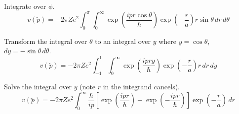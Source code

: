 Integrate over $\phi$.
\begin{equation*}
v(\breve p)=-2\pi Ze^2\int_0^\pi\int_0^\infty
\exp\left(\frac{i\breve pr\cos\theta}{\hbar}\right)
\exp\left(-\frac{r}{a}\right)r\sin\theta
\,dr\,d\theta
\end{equation*}

\iffalse
Convert the first exponential to rectangular form.
\begin{equation*}
v(\breve p)=-2\pi Ze^2\int_0^\pi\int_0^\infty
\left[\cos\left(\frac{\breve pr\cos\theta}{\hbar}\right)
+i\sin\left(\frac{\breve pr\cos\theta}{\hbar}\right)\right]
\exp\left(-\frac{r}{a}\right)r\sin\theta\,dr\,d\theta
\end{equation*}

By the definite integrals
\begin{equation*}
\int_0^\pi\cos(a\cos\theta)\sin\theta\,d\theta=\frac{2\sin a}{a},\quad
\int_0^\pi\sin(a\cos\theta)\sin\theta\,d\theta=0
\end{equation*}

we have for the integral over $\theta$ (note that $r$ in the integrand cancels)
\begin{equation*}
v(\breve p)=-\frac{4\pi Ze^2\hbar}{\breve p}
\int_0^\infty
\sin\left(\frac{\breve pr}{\hbar}\right)
\exp\left(-\frac{r}{a}\right)\,dr
\end{equation*}

By the definite integral
\begin{equation*}
\int_0^\infty\sin(ay)\exp(-by)\,dy=\frac{a}{a^2+b^2}
\end{equation*}

we have for the integral over $r$
\begin{equation*}
v(\breve p)=-\frac{4\pi Ze^2\hbar}{\breve p}\times
\frac{\breve p/\hbar}
{(\breve p/\hbar)^2+(1/a)^2}
\end{equation*}

Hence
\begin{equation*}
v(\breve p)=-\frac{4\pi Ze^2}
{(\breve p/\hbar)^2+(1/a)^2}
\end{equation*}
\fi

Transform the integral over $\theta$ to an integral over $y$
where $y=\cos\theta$, $dy=-\sin\theta\,d\theta$.
\begin{equation*}
v(\breve p)=-2\pi Ze^2
\int_{-1}^1
\int_0^\infty
\exp\left(\frac{ipry}{\hbar}\right)
\exp\left(-\frac{r}{a}\right)
r\,dr\,dy
\end{equation*}

Solve the integral over $y$ (note $r$ in the integrand cancels).
\begin{equation*}
v(\breve p)=-2\pi Ze^2
\int_0^\infty
\frac{\hbar}{ip}
\left[\exp\left(\frac{ipr}{\hbar}\right)-\exp\left(-\frac{ipr}{\hbar}\right)\right]
\exp\left(-\frac{r}{a}\right)
\,dr
\end{equation*}

